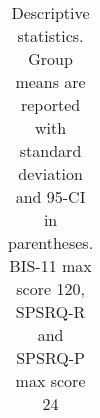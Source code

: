 \begin{table}[H]
\begin{subtable}[c]{0.5\textwidth}
\begin{tabular}{ l l c}
\end{tabular}
\end{subtable}
\caption{Descriptive statistics. Group means are reported with standard deviation and 95-CI in parentheses. BIS-11 max score 120, SPSRQ-R and SPSRQ-P max score 24}\end{table}
